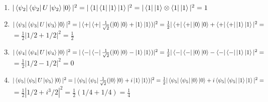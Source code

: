 \documentclass[12pt]{article}
\begin{document}
\begin{enumerate}
\begin{enumerate}
    \item $|\bra{\psi_2}\bra{\psi_2}U\ket{\psi_2} \ket{0}|^2 = |\bra{1}\bra{1}\ket{1}\ket{1}|^2 = |\bra{1}\ket{1}\otimes \bra{1}\ket{1}|^2 = 1 $

    \item $|\bra{\psi_3}\bra{\psi_3}U\ket{\psi_3} \ket{0}|^2 = |\bra{+}\bra{+}\frac{1}{\sqrt{2}}(\ket{0}\ket{0} + \ket{1}\ket{1})|^2 = \frac{1}{2}|\bra{+}\bra{+}\ket{0}\ket{0} + \bra{+}\bra{+}\ket{1}\ket{1}|^2 = $\\
    $= \frac{1}{2}|1/2 + 1/2|^2 = \frac{1}{2}$
    
    \item $|\bra{\psi_4}\bra{\psi_4}U\ket{\psi_4} \ket{0}|^2 = |\bra{-}\bra{-}\frac{1}{\sqrt{2}}(\ket{0}\ket{0} - \ket{1}\ket{1})|^2 = \frac{1}{2}|\bra{-}\bra{-}\ket{0}\ket{0} - \bra{-}\bra{-}\ket{1}\ket{1}|^2 = $\\
    $= \frac{1}{2}|1/2 - 1/2|^2 = 0$
    
    \item $|\bra{\psi_5}\bra{\psi_5}U\ket{\psi_5} \ket{0}|^2 = |\bra{\psi_5}\bra{\psi_5}\frac{1}{\sqrt{2}}(\ket{0}\ket{0} + i\ket{1}\ket{1})|^2 = \frac{1}{2}|\bra{\psi_5}\bra{\psi_5}\ket{0}\ket{0} + i\bra{\psi_5}\bra{\psi_5}\ket{1}\ket{1}|^2 = $\\
    $= \frac{1}{2}|1/2 + i^3/2|^2 = \frac{1}{2}(1/4+1/4) = \frac{1}{4}$    


\end{enumerate}
\end{enumerate}
\end{document}

